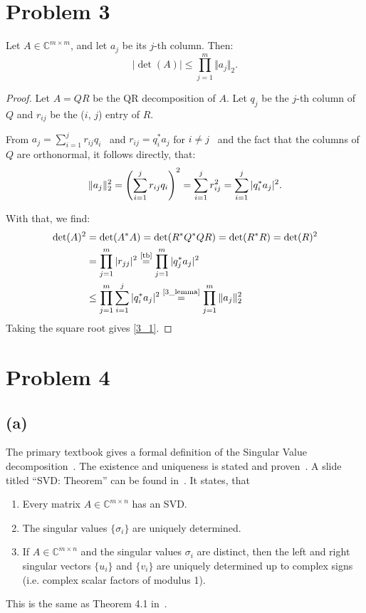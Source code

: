 \documentclass[a4paper, 11pt]{article}
\begin{document}
\section*{Problem 3}
Let $A \in \mathbb{C}^{m \times m}$, and let $a_j$ be its $j$-th column. Then:
\begin{equation}
  \vert \det(A) \vert \leq \prod_{j = 1}^m \Vert a_j\Vert_2.
  \label{3_1}
\end{equation}
\begin{proof}
  Let $A = QR$ be the QR decomposition of $A$. Let $q_j$ be the $j$-th
  column of $Q$ and $r_{ij}$ be the ($i$, $j$) entry of $R$.

  From $a_j = \sum_{i=1}^j r_{ij}q_i$~\cite[(7.3)]{tb}
  and $r_{ij} = q_i^*a_j$ for $i \neq j$~\cite[(7.7)]{tb} and the fact that the
  columns of $Q$ are orthonormal, it follows directly, that:
  \begin{equation}
  \Vert a_j \Vert_2^2 = \left(\sum_{i=1}^j r_{ij}q_i\right)^2 = \sum_{i=1}^j
  r_{ij}^2 = \sum_{i=1}^j \vert q_i^* a_j\vert^2.\\ \label{3_lemma}
  \end{equation}

  With that, we find:
  \begin{align*}
    \det(A)^2 &= \det(A^*A) = \det(R^*Q^*QR) = \det(R^*R) = \det(R)^2 \\
    &= \prod_{j = 1}^m \vert r_{jj}\vert^2 \stackrel{\text{\cite[(7.7)]{tb}}}{=}
    \prod_{j = 1}^m \vert q_j^*a_j\vert^2 \\
    &\leq \prod_{j = 1}^m \sum_{i = 1}^j \vert q_i^*a_j\vert^2 \stackrel{\text{\eqref{3_lemma}}}{=} \prod_{j = 1}^m \Vert a_j\Vert_2^2
  \end{align*}
  Taking the square root gives \eqref{3_1}.
\end{proof}

\section*{Problem 4}
\subsection*{(a)}
The primary textbook gives a formal definition of the Singular Value
decomposition~\cite[pp. 28-29]{tb}. The existence and uniqueness is stated and
proven~\cite[Theorem 4.1]{tb}. A slide titled ``SVD: Theorem'' can be found
in~\cite{slides}. It states, that
\begin{enumerate}
  \item Every matrix $A \in \mathbb{C}^{m\times n}$ has an SVD.
  \item The singular values $\{\sigma_i\}$ are uniquely determined.
  \item If $A \in \mathbb{C}^{m\times n}$ and the singular values $\sigma_i$
    are distinct, then the left and right singular vectors $\{u_i\}$ and
    $\{v_i\}$ are uniquely determined up to complex signs (i.e. complex scalar
    factors of modulus 1).
\end{enumerate}
This is the same as Theorem 4.1 in~\cite{tb}.
\end{document}

